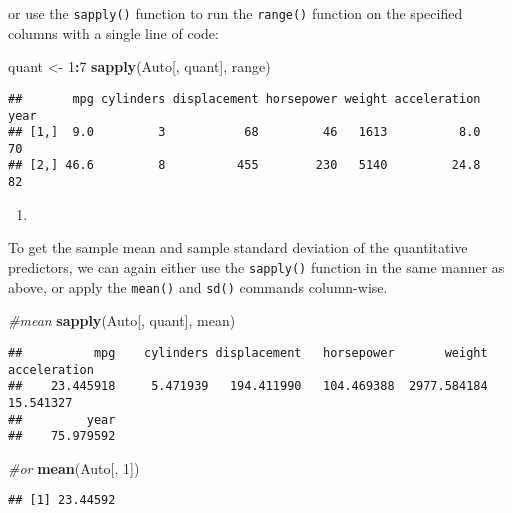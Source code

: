 \documentclass[
]{article}
\newenvironment{Shaded}{\begin{snugshade}}{\end{snugshade}}
\newcommand{\CommentTok}[1]{\textcolor[rgb]{0.56,0.35,0.01}{\textit{#1}}}
\newcommand{\DecValTok}[1]{\textcolor[rgb]{0.00,0.00,0.81}{#1}}
\newcommand{\FunctionTok}[1]{\textcolor[rgb]{0.13,0.29,0.53}{\textbf{#1}}}
\newcommand{\NormalTok}[1]{#1}
\newcommand{\OtherTok}[1]{\textcolor[rgb]{0.56,0.35,0.01}{#1}}
\newcommand{\SpecialCharTok}[1]{\textcolor[rgb]{0.81,0.36,0.00}{\textbf{#1}}}
\providecommand{\tightlist}{%
  \setlength{\itemsep}{0pt}\setlength{\parskip}{0pt}}
\begin{document}
or use the \texttt{sapply()} function to run the \texttt{range()}
function on the specified columns with a single line of code:

\begin{Shaded}
\begin{Highlighting}[]
\NormalTok{quant }\OtherTok{\textless{}{-}} \DecValTok{1}\SpecialCharTok{:}\DecValTok{7}
\FunctionTok{sapply}\NormalTok{(Auto[, quant], range)}
\end{Highlighting}
\end{Shaded}

\begin{verbatim}
##       mpg cylinders displacement horsepower weight acceleration year
## [1,]  9.0         3           68         46   1613          8.0   70
## [2,] 46.6         8          455        230   5140         24.8   82
\end{verbatim}

\begin{enumerate}
\def\labelenumi{\alph{enumi})}
\setcounter{enumi}{2}
\tightlist
\item
\end{enumerate}

To get the sample mean and sample standard deviation of the quantitative
predictors, we can again either use the \texttt{sapply()} function in
the same manner as above, or apply the \texttt{mean()} and \texttt{sd()}
commands column-wise.

\begin{Shaded}
\begin{Highlighting}[]
\CommentTok{\#mean}
\FunctionTok{sapply}\NormalTok{(Auto[, quant], mean)}
\end{Highlighting}
\end{Shaded}

\begin{verbatim}
##          mpg    cylinders displacement   horsepower       weight acceleration 
##    23.445918     5.471939   194.411990   104.469388  2977.584184    15.541327 
##         year 
##    75.979592
\end{verbatim}

\begin{Shaded}
\begin{Highlighting}[]
\CommentTok{\#or}
\FunctionTok{mean}\NormalTok{(Auto[, }\DecValTok{1}\NormalTok{])}
\end{Highlighting}
\end{Shaded}

\begin{verbatim}
## [1] 23.44592
\end{verbatim}
\end{document}
